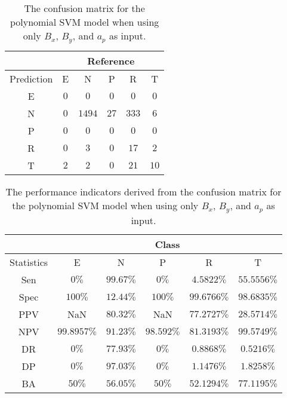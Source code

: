 \begin{table}[!ht]
	\centering
	\begin{tabular}{|c|c|c|c|c|c|}
		\hline
		 & \multicolumn{5}{|c|}{Reference} \\ \hline
		 Prediction & E & N & P & R & T \\ \hline
		 E & $0$ & $0$ & $0$ & $0$ & $0$ \\ \hline
		 N & $0$ & $1494$ & $27$ & $333$ & $6$ \\ \hline
		 P & $0$ & $0$ & $0$ & $0$ & $0$ \\ \hline
		 R & $0$ & $3$ & $0$ & $17$ & $2$ \\ \hline
		 T & $2$ & $2$ & $0$ & $21$ & $10$ \\ \hline
	\end{tabular}
	\caption{The confusion matrix for the polynomial SVM model when using only $B_{x}$, $B_{y}$, and $a_{p}$ as input.}
	\label{tab:cm:xyap:svmPoly}
\end{table}

\begin{table}[!ht]
	\centering
	\begin{tabular}{|c|c|c|c|c|c|}
		\hline
		 & \multicolumn{5}{c|}{Class} \\ \hline
		Statistics & E & N & P & R & T \\ \hline
		Sen & $0\%$ & $99.67\%$ & $0\%$ & $4.5822\%$ & $55.5556\%$ \\ \hline
		Spec & $100\%$ & $12.44\%$ & $100\%$ & $99.6766\%$ & $98.6835\%$ \\ \hline
		PPV & NaN & $80.32\%$ & NaN & $77.2727\%$ & $28.5714\%$ \\ \hline
		NPV & $99.8957\%$ & $91.23\%$ & $98.592\%$ & $81.3193\%$ & $99.5749\%$ \\ \hline
		DR & $0\%$ & $77.93\%$ & $0\%$ & $0.8868\%$ & $0.5216\%$ \\ \hline
		DP & $0\%$ & $97.03\%$ & $0\%$ & $1.1476\%$ & $1.8258\%$ \\ \hline
		BA & $50\%$ & $56.05\%$ & $50\%$ & $52.1294\%$ & $77.1195\%$ \\ \hline
	\end{tabular}
	\caption{The performance indicators derived from the confusion matrix for the polynomial SVM model when using only $B_{x}$, $B_{y}$, and $a_{p}$ as input.}
	\label{tab:cs:reverse:xyap:svmPoly}
\end{table}

